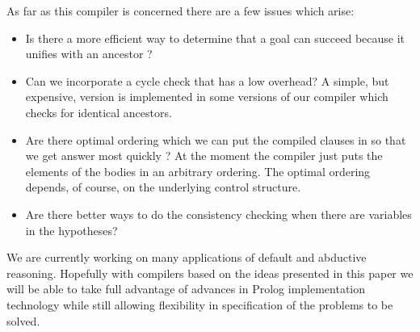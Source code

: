 As far as this compiler is concerned there are a few issues which
arise:
\begin{itemize}
\item Is there a more efficient way to determine that a goal can succeed because
it unifies with an ancestor \cite{poole:grace,loveland87}?
\item Can we incorporate a cycle check that has a low overhead?
A simple, but expensive, version is implemented in some versions of
our compiler which checks for identical ancestors.
\item Are there optimal ordering which we can put the compiled
clauses in so that we get answer most quickly \cite{smith86}?
At the moment the compiler just puts the elements of the bodies
in an arbitrary ordering. The optimal ordering depends, of course,
on the underlying control structure.
\item Are there better ways to do the consistency checking when there are
variables in the hypotheses?
\end{itemize}


We are currently working on many applications of default and abductive
reasoning.
Hopefully with compilers based on the ideas presented in this paper
we will be able to take full advantage of
advances in Prolog implementation technology while still allowing
flexibility in specification of the problems to be solved.
